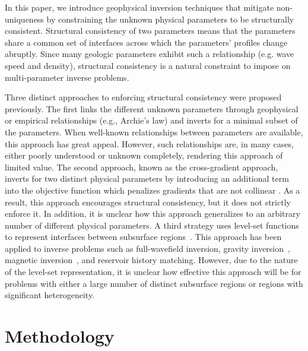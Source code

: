 \documentclass[manuscript,revised]{geophysics}
\begin{document}
In this paper, we introduce geophysical inversion techniques that mitigate non-uniqueness by constraining the unknown physical parameters to be structurally consistent.  Structural consistency of two parameters means that the parameters share a common set of interfaces across which the parameters' profiles  change abruptly.  Since many geologic parameters exhibit such a relationship (e.g. wave speed and density), structural consistency is a natural constraint to impose on multi-parameter inverse problems.  

Three distinct approaches to enforcing structural consistency were proposed previously.  The first links the different unknown parameters through geophysical or empirical relationships (e.g., Archie’s law) and inverts for a minimal subset of the parameters. When well-known relationships between parameters are available, this approach has great appeal. However, such relationships are, in many cases, either poorly understood or unknown completely, rendering this approach of limited value.  The second approach, known as the cross-gradient approach, inverts for two distinct physical parameters by introducing an additional term into the objective function which penalizes gradients that are not collinear \cite[]{Haber_1997,Gallardo_2007}. As a result, this approach encourages structural consistency, but it does not strictly enforce it. In addition, it is unclear how this approach generalizes to an arbitrary number of different physical parameters. 
A third strategy uses level-set functions to represent interfaces between subsurface regions~\cite[]{Kadu_2016}. This approach has been applied to inverse problems such as full-wavefield inversion, gravity inversion~\cite[]{Li_2016}, magnetic inversion~\cite[]{Li_2017}, and reservoir history matching. However, due to the nature of the level-set representation, it is unclear how effective this approach will be for problems with either a large number of distinct subsurface regions or regions with significant heterogeneity. 

\section{Methodology}
\end{document}
